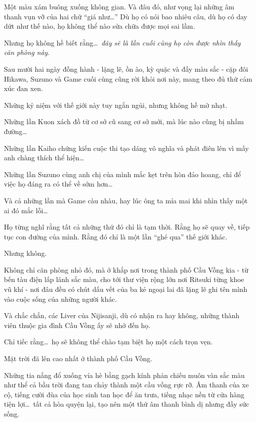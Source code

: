 \documentclass[../main.tex]{subfiles}
\begin{document}
Một màu xám buông xuống không gian. Và đâu đó, như vọng lại những âm thanh vụn vỡ của hai chữ ``giá như\dots'' Dù họ có nói bao nhiêu câu, dù họ có day dứt như thế nào, họ không thể nào sửa chữa được mọi sai lầm.

Nhưng họ không hề biết rằng\dots\ \emph{đây sẽ là lần cuối cùng họ còn được nhìn thấy căn phòng này}.

\il

Sau mười hai ngày đồng hành - lặng lẽ, ồn ào, kỳ quặc và đầy màu sắc - cặp đôi Hikawa, Suzuno và Game cuối cùng cũng rời khỏi nơi này, mang theo đủ thứ cảm xúc đan xen.

Những kỷ niệm với thế giới này tuy ngắn ngủi, nhưng không hề mờ nhạt.

Những lần Kuon xách đồ từ cơ sở cũ sang cơ sở mới, mà lúc nào cũng bị nhầm đường\dots

Những lần Kaiho chứng kiến cuộc thi tạo dáng vô nghĩa và phát điên lên vì mấy anh chàng thích thể hiện\dots

Những lần Suzuno cùng anh chị của mình mắc kẹt trên hòn đảo hoang, chỉ để việc họ đáng ra có thể về sớm hơn\dots

Và cả những lần mà Game càu nhàu, hay lúc ông ta mỉa mai khi nhìn thấy một ai đó mắc lỗi\dots

Họ từng nghĩ rằng tất cả những thứ đó chỉ là tạm thời. Rằng họ sẽ quay về, tiếp tục con đường của mình. Rằng đó chỉ là một lần ``ghé qua'' thế giới khác.

Nhưng không.

Không chỉ căn phòng nhỏ đó, mà ở khắp nơi trong thành phố Cầu Vồng kia - từ bến tàu điện lấp lánh sắc màu, cho tới thư viện rộng lớn nơi Ritsuki từng khoe vũ khí - nơi đâu đều có chút dấu vết của ba kẻ ngoại lai đã lặng lẽ ghi tên mình vào cuộc sống của những người khác.

Và chắc chắn, các Liver của Nijisanji, dù có nhận ra hay không, những thành viên thuộc gia đình Cầu Vồng ấy sẽ nhớ đến họ.

Chỉ tiếc rằng\dots\ họ sẽ không thể chào tạm biệt họ một cách trọn vẹn.

\il

Mặt trời đã lên cao nhất ở thành phố Cầu Vồng.

Những tia nắng đổ xuống vỉa hè bằng gạch kính phản chiếu muôn vàn sắc màu như thể cả bầu trời đang tan chảy thành một cầu vồng rực rỡ. Âm thanh của xe cộ, tiếng cười đùa của học sinh tan học để ăn trưa, tiếng nhạc nền từ cửa hàng tiện lợi\dots\ tất cả hòa quyện lại, tạo nên một thứ âm thanh bình dị nhưng đầy sức sống.
\end{document}
